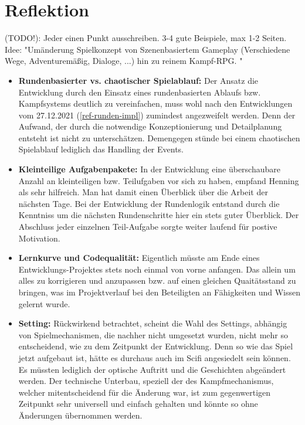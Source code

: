 
\section{Reflektion}

(TODO!): Jeder einen Punkt ausschreiben. 3-4 gute Beispiele, max 1-2 Seiten. Idee: "Umänderung Spielkonzept von Szenenbasiertem Gameplay (Verschiedene Wege, Adventuremäßig, Dialoge, ...) hin zu reinem Kampf-RPG. "

\begin{itemize}

    \item \textbf{Rundenbasierter vs. chaotischer Spielablauf:} Der Ansatz die Entwicklung durch den Einsatz eines rundenbasierten Ablaufs bzw. Kampfsystems deutlich zu vereinfachen, muss wohl nach den Entwicklungen vom 27.12.2021 (\ref{ref-runden-impl}) zumindest angezweifelt werden. Denn der Aufwand, der durch die notwendige Konzeptionierung und Detailplanung entsteht ist nicht zu unterschätzen. Demengegen stünde bei einem chaotischen Spielablauf lediglich das Handling der Events. 

    \item \textbf{Kleinteilige Aufgabenpakete:} In der Entwicklung eine überschaubare Anzahl an kleinteiligen bzw. Teilufgaben vor sich zu haben, empfand Henning als sehr hilfreich. Man hat damit einen Überblick über die Arbeit der nächsten Tage. Bei der Entwicklung der Rundenlogik entstand durch die Kenntniss um die nächsten Rundenschritte hier ein stets guter Überblick. Der Abschluss jeder einzelnen Teil-Aufgabe sorgte weiter laufend für postive Motivation.

    \item \textbf{Lernkurve und Codequalität:} Eigentlich müsste am Ende eines Entwicklungs-Projektes stets noch einmal von vorne anfangen. Das allein um alles zu korrigieren und anzupassen bzw. auf einen gleichen Quaitätsstand zu bringen, was im Projektverlauf bei den Beteiligten an Fähigkeiten und Wissen gelernt wurde.
    
    \item \textbf{Setting:} Rückwirkend betrachtet, scheint die Wahl des Settings, abhängig von Spielmechanismen, die nachher nicht umgesetzt wurden, nicht mehr so entscheidend, wie zu dem Zeitpunkt der Entwicklung. Denn so wie das Spiel jetzt aufgebaut ist, hätte es durchaus auch im Scifi angesiedelt sein können. Es müssten lediglich der optische Auftritt und die Geschichten abgeändert werden. Der technische Unterbau, speziell der des Kampfmechanismus, welcher mitentscheidend für die Änderung war, ist zum gegenwertigen Zeitpunkt sehr universell und einfach gehalten und könnte so ohne Änderungen übernommen werden.


\end{itemize}
